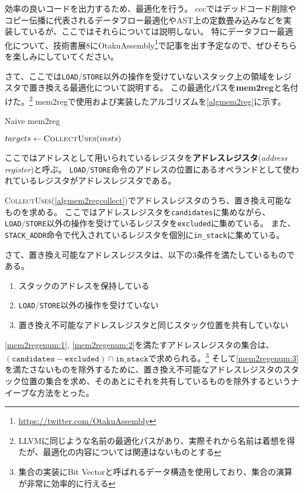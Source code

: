 \documentclass[../main.tex]{subfiles}
\begin{document}
効率の良いコードを出力するため、最適化を行う。
cccではデッドコード削除やコピー伝播に代表されるデータフロー最適化やAST上の定数畳み込みなどを実装しているが、ここではそれらについては説明しない。
特にデータフロー最適化について、技術書展8にOtakuAssembly\footnote{\url{https://twitter.com/OtakuAssembly}}で記事を出す予定なので、ぜひそちらを楽しみにしていてください。

さて、ここでは\texttt{LOAD}/\texttt{STORE}以外の操作を受けていないスタック上の領域をレジスタで置き換える最適化について説明する。
この最適化パスを\textbf{mem2reg}と名付けた。\footnote{LLVMに同じような名前の最適化パスがあり、実際それから名前は着想を得たが、最適化の内容については関連はないものとする}
mem2regで使用および実装したアルゴリズムを\cref{algmem2reg}に示す。

\begin{algorithm}[h]
\caption{Naive mem2reg}\label{algmem2reg}
\begin{algorithmic}[1]
  \State $targets \gets \Call{CollectUses}{insts}$
  \State {}
\EndProcedure
\end{algorithmic}
\end{algorithm}

ここではアドレスとして用いられているレジスタを\textbf{アドレスレジスタ}(\textit{address register})と呼ぶ。
\texttt{LOAD}/\texttt{STORE}命令のアドレスの位置にあるオペランドとして使われているレジスタがアドレスレジスタである。

\textsc{CollectUses}(\cref{algmem2regcollect})でアドレスレジスタのうち、置き換え可能なものを求める。
ここではアドレスレジスタを\texttt{candidates}に集めながら、\texttt{LOAD}/\texttt{STORE}以外の操作を受けているレジスタを\texttt{excluded}に集めている。
また、\texttt{STACK\_ADDR}命令で代入されているレジスタを個別に\texttt{in\_stack}に集めている。

さて、置き換え可能なアドレスレジスタは、以下の3条件を満たしているものである。
\begin{enumerate}
  \item \label{mem2regenum:1}スタックのアドレスを保持している
  \item \label{mem2regenum:2}\texttt{LOAD}/\texttt{STORE}以外の操作を受けていない
  \item \label{mem2regenum:3}置き換え不可能なアドレスレジスタと同じスタック位置を共有していない
\end{enumerate}
\cref{mem2regenum:1}, \cref{mem2regenum:2}を満たすアドレスレジスタの集合は、$(\texttt{candidates} - \texttt{excluded}) \cap {\texttt{in\_stack}}$で求められる。\footnote{集合の実装にBit Vectorと呼ばれるデータ構造を使用しており、集合の演算が非常に効率的に行える}
そして\cref{mem2regenum:3}を満たさないものを除外するために、置き換え不可能なアドレスレジスタのスタック位置の集合を求め、そのあとにそれを共有しているものを除外するというナイーブな方法をとった。
\end{document}
